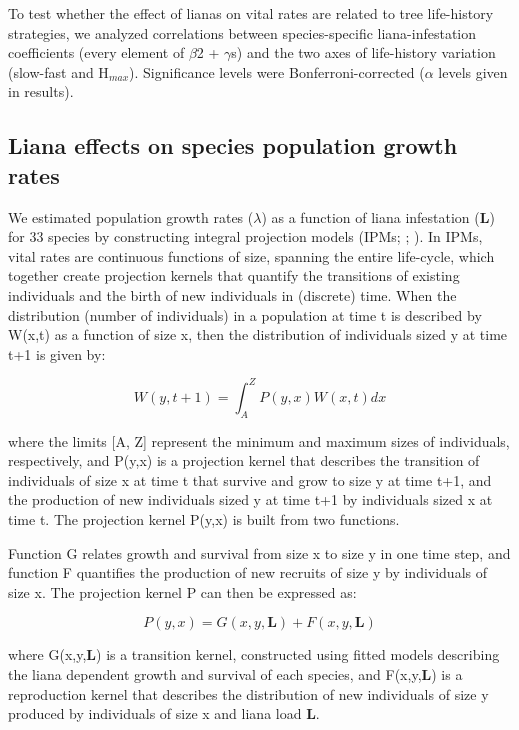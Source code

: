 \documentclass[b5paper,justified]{tufte-book} %
\begin{document}
\begin{fullwidth}
To test whether the effect of lianas on vital rates are related to tree life-history strategies, we analyzed correlations between species-specific liana-infestation coefficients (every element of $\beta$2 + $\gamma$s) and the two axes of life-history variation (slow-fast and H$_{max}$). Significance levels were Bonferroni-corrected ($\alpha$ levels given in results).

\subsection{Liana effects on species population growth rates}
	We estimated population growth rates ($\lambda$) as a function of liana infestation (\textbf{L}) for 33 species by constructing integral projection models (IPMs; \citealt{Easterling2000}; \citealt{Ellner2006}). In IPMs, vital rates are continuous functions of size, spanning the entire life-cycle, which together create projection kernels that quantify the transitions of existing individuals and the birth of new individuals in (discrete) time. When the distribution (number of individuals) in a population at time t is described by W(x,t) as a function of size x, then the distribution of individuals sized y at time t+1 is given by:  

\begin{equation}
W(y,t+1)=\int_{A}^{Z} P(y,x)W(x,t)dx						
\label{eq:chap7eq2}
\end{equation}

where the limits [A, Z] represent the minimum and maximum sizes of individuals, respectively, and P(y,x) is a projection kernel that describes the transition of individuals of size x at time t that survive and grow to size y at time t+1, and the production of new individuals sized y at time t+1 by individuals sized x at time t. The projection kernel P(y,x) is built from two functions. 

Function G relates growth and survival from size x to size y in one time step, and function F quantifies the production of new recruits of size y by individuals of size x. The projection kernel P can then be expressed as:

\begin{equation}
P(y,x)=G(x,y,\textbf{L})+F(x,y,\textbf{L})
\label{eq:chap7eq3}
\end{equation}
 
where G(x,y,\textbf{L}) is a transition kernel, constructed using fitted models describing the liana dependent growth and survival of each species, and F(x,y,\textbf{L}) is a reproduction kernel that describes the distribution of new individuals of size y produced by individuals of size x and liana load \textbf{L}. 


\end{fullwidth}
\end{document}

